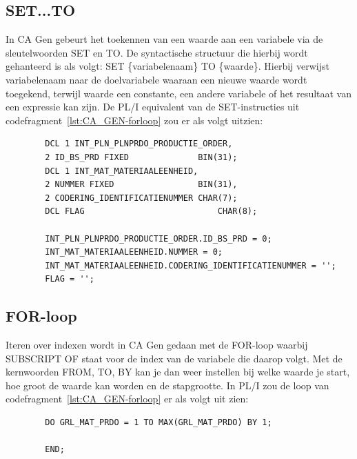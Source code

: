 \subsection{SET...TO}
In CA Gen gebeurt het toekennen van een waarde aan een variabele via de sleutelwoorden SET en TO. 
De syntactische structuur die hierbij wordt gehanteerd is als volgt: SET \{variabelenaam\} TO \{waarde\}. Hierbij verwijst {variabelenaam} naar de doelvariabele waaraan een nieuwe waarde wordt toegekend, terwijl {waarde} een constante, een andere variabele of het resultaat van een expressie kan zijn. De PL/I equivalent van de SET-instructies uit codefragment~\ref{lst:CA_GEN-forloop} zou er als volgt uitzien:
\begin{listing}[h]
    \caption[PL/I voorbeeld van variabele declaratie en assignatie]{PL/I voorbeeld van variabele declaratie en assignatie}
    \label{lst:PL/I-variabelen}
    \begin{verbatim}
        DCL 1 INT_PLN_PLNPRDO_PRODUCTIE_ORDER,
        2 ID_BS_PRD FIXED              BIN(31);
        DCL 1 INT_MAT_MATERIAALEENHEID,
        2 NUMMER FIXED                 BIN(31),
        2 CODERING_IDENTIFICATIENUMMER CHAR(7);
        DCL FLAG                           CHAR(8);
        
        INT_PLN_PLNPRDO_PRODUCTIE_ORDER.ID_BS_PRD = 0;
        INT_MAT_MATERIAALEENHEID.NUMMER = 0; 
        INT_MAT_MATERIAALEENHEID.CODERING_IDENTIFICATIENUMMER = '';
        FLAG = '';         
    \end{verbatim}
\end{listing}

\subsection{FOR-loop}
Iteren over indexen wordt in CA Gen gedaan met de FOR-loop waarbij SUBSCRIPT OF staat voor de index van de variabele die daarop volgt. Met de kernwoorden FROM, TO, BY kan je dan weer instellen bij welke waarde je start, hoe groot de waarde kan worden en de stapgrootte. In PL/I zou de loop van codefragment~\ref{lst:CA_GEN-forloop} er als volgt uit zien:

\begin{listing}[h]
    \caption[PL/I voorbeeld van FOR LOOP]{PL/I voorbeeld van FOR LOOP}
    \label{lst:PL/I-forloop}
    \begin{verbatim}
        DO GRL_MAT_PRDO = 1 TO MAX(GRL_MAT_PRDO) BY 1;
        
        END;
    \end{verbatim}
\end{listing}

